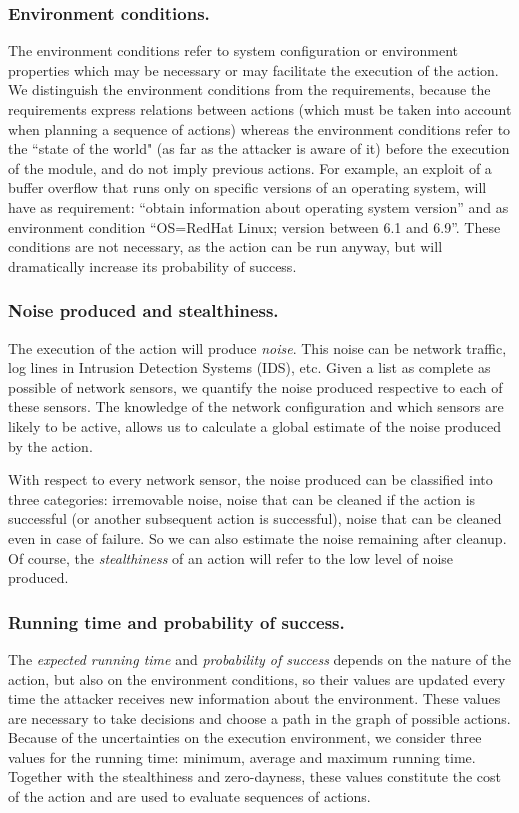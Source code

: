 \documentclass{llncs}
\begin{document}
\subsubsection{Environment conditions.}
The environment conditions refer
to system configuration or environment properties which may be
necessary or may facilitate the execution of the action.
We distinguish the environment conditions from the requirements,
because the requirements express relations between actions
(which must be taken into account when planning a sequence of actions)
whereas the environment conditions refer to the ``state of the world"
(as far as the attacker is aware of it) before the execution of the module,
and do not imply previous actions. 
For example, an exploit of a buffer overflow that runs only on specific versions
of an operating system, will have as requirement: ``obtain information
about operating system version'' and as environment condition
``OS=RedHat Linux; version between 6.1 and 6.9''. These conditions are
not necessary, as the action can be run anyway, but will dramatically
increase its probability of success.


\subsubsection{Noise produced and stealthiness.}
The execution of the action will produce {\em noise}. This noise
can be network traffic, log lines in Intrusion Detection Systems (IDS), etc. 
Given a list as complete as possible of network sensors,
we quantify the noise produced respective to each of these sensors.
The knowledge of the network configuration and which sensors
are likely to be active, allows us to calculate a global estimate of 
the noise produced by the action. 

With respect to every network sensor, the noise produced can be
classified into three categories: irremovable noise, noise that can
be cleaned if the action is successful (or another subsequent
action is successful), noise that can be cleaned even in
case of failure. So we can also estimate the noise remaining after
cleanup. Of course, the {\em stealthiness} of an action will refer
to the low level of noise produced.


\subsubsection{Running time and probability of success.}
The {\em expected running time} and {\em probability of success}
depends on the nature of the action, but also
on the environment conditions, so their values are updated
every time the attacker receives new information about the environment.
These values are necessary to take decisions and choose a path
in the graph of possible actions. Because of the uncertainties
on the execution environment, we consider three values for the
running time: minimum, average and maximum running time.
Together with the stealthiness and zero-dayness,
these values constitute the cost of the action
and are used to evaluate sequences of actions.
\end{document}

